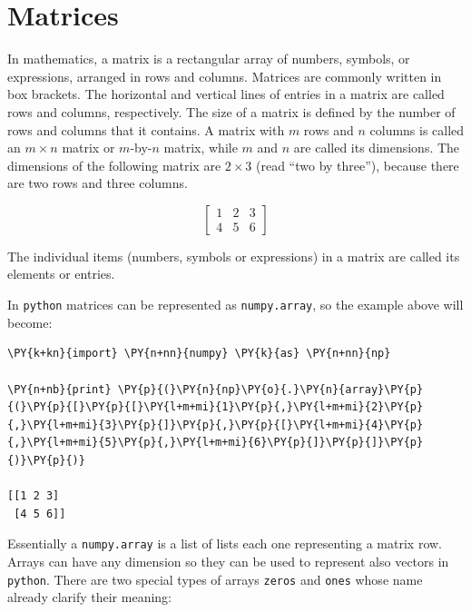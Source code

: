 \chapter{Matrices}\label{app:matrices}

In mathematics, a matrix is a rectangular array of
numbers, symbols, or expressions, arranged in rows and columns. Matrices
are commonly written in box brackets. The horizontal and vertical lines
of entries in a matrix are called rows and columns, respectively. The
size of a matrix is defined by the number of rows and columns that it
contains. A matrix with \(m\) rows and \(n\) columns is called an
\(m\times n\) matrix or \(m\)-by-\(n\) matrix, while \(m\) and \(n\) are
called its dimensions. The dimensions of the following matrix are
\(2\times 3\) (read ``two by three''), because there are two rows and
three columns.

\[\begin{bmatrix}
1 & 2 & 3\\
4 & 5 & 6
\end{bmatrix}\]

The individual items (numbers, symbols or expressions) in a matrix are
called its elements or entries.

In \texttt{python} matrices can be represented as \texttt{numpy.array},
so the example above will become:

\begin{tcolorbox}[breakable, size=fbox, boxrule=1pt, pad at break*=1mm,colback=cellbackground, colframe=cellborder]
\begin{Verbatim}[commandchars=\\\{\}]
\PY{k+kn}{import} \PY{n+nn}{numpy} \PY{k}{as} \PY{n+nn}{np}

\PY{n+nb}{print} \PY{p}{(}\PY{n}{np}\PY{o}{.}\PY{n}{array}\PY{p}{(}\PY{p}{[}\PY{p}{[}\PY{l+m+mi}{1}\PY{p}{,}\PY{l+m+mi}{2}\PY{p}{,}\PY{l+m+mi}{3}\PY{p}{]}\PY{p}{,}\PY{p}{[}\PY{l+m+mi}{4}\PY{p}{,}\PY{l+m+mi}{5}\PY{p}{,}\PY{l+m+mi}{6}\PY{p}{]}\PY{p}{]}\PY{p}{)}\PY{p}{)}

[[1 2 3]
 [4 5 6]]
\end{Verbatim}
\end{tcolorbox}

Essentially a \texttt{numpy.array} is a list of lists each one
representing a matrix row. Arrays can have any dimension so they can be
used to represent also vectors in \texttt{python}. There are two special
types of arrays \texttt{zeros} and \texttt{ones} whose name already
clarify their meaning:


